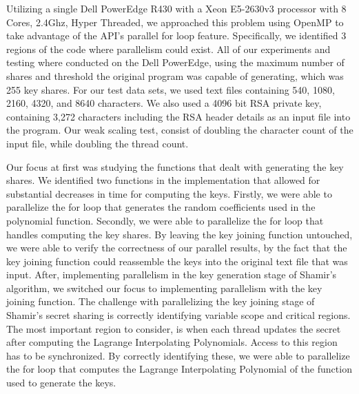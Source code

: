 \documentclass[main.tex]{subfiles}
\begin{document}
\indent Utilizing a single Dell PowerEdge R430 with a Xeon E5-2630v3 processor with 8 Cores, 2.4Ghz, Hyper Threaded, we approached this problem using OpenMP to take advantage of the API's parallel for loop feature. Specifically, we identified 3 regions of the code where parallelism could exist. All of our experiments and testing where conducted on the Dell PowerEdge, using the maximum number of shares and threshold the original program was capable of generating, which was 255 key shares.  For our test data sets, we used text files containing 540, 1080, 2160, 4320, and 8640 characters.  We also used a 4096 bit RSA private key, containing 3,272 characters including the RSA header details as an input file into the program.  Our weak scaling test, consist of doubling the character count of the input file, while doubling the thread count.

\indent Our focus at first was studying the functions that dealt with generating the key shares. We identified two functions in the implementation that allowed for substantial decreases in time for computing the keys.  Firstly, we were able to parallelize the for loop that generates the random coefficients used in the polynomial function.  Secondly, we were able to parallelize the for loop that handles computing the key shares.  By leaving the key joining function untouched, we were able to verify the correctness of our parallel results, by the fact that the key joining function could reassemble the keys into the original text file that was input.
\indent After, implementing parallelism in the key generation stage of Shamir's algorithm, we switched our focus to implementing parallelism with the key joining function.  The challenge with parallelizing the key joining stage of Shamir's secret sharing is correctly identifying variable scope and critical regions. The most important region to consider, is when each thread updates the secret after computing the Lagrange Interpolating Polynomials.  Access to this region has to be synchronized. By correctly identifying these, we were able to parallelize the for loop that computes the Lagrange Interpolating Polynomial of the function used to generate the keys.  
\end{document}
